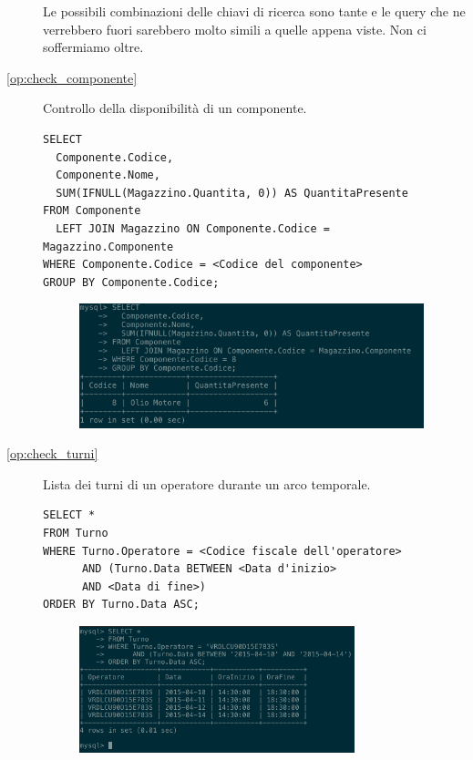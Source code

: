 \begin{description}
            Le possibili combinazioni delle chiavi di ricerca sono tante e le query che ne verrebbero fuori sarebbero molto simili a quelle appena viste. Non ci soffermiamo oltre.

            \item[\ref{op:check_componente}] Controllo della disponibilità di un componente.

              \begin{lstlisting}
SELECT
  Componente.Codice,
  Componente.Nome,
  SUM(IFNULL(Magazzino.Quantita, 0)) AS QuantitaPresente
FROM Componente
  LEFT JOIN Magazzino ON Componente.Codice = Magazzino.Componente
WHERE Componente.Codice = <Codice del componente>
GROUP BY Componente.Codice;
              \end{lstlisting}

              \begin{figure}[H]
                \centering
                \includegraphics[width=10cm]{images/screenshots/check_componente.png}
              \end{figure}

            \item[\ref{op:check_turni}] Lista dei turni di un operatore durante un arco temporale.

              \begin{lstlisting}
SELECT *
FROM Turno
WHERE Turno.Operatore = <Codice fiscale dell'operatore>
      AND (Turno.Data BETWEEN <Data d'inizio>
      AND <Data di fine>)
ORDER BY Turno.Data ASC;
              \end{lstlisting}

              \begin{figure}[H]
                \centering
                \includegraphics[width=8cm]{images/screenshots/show_turni.png}
              \end{figure}


\end{description}
